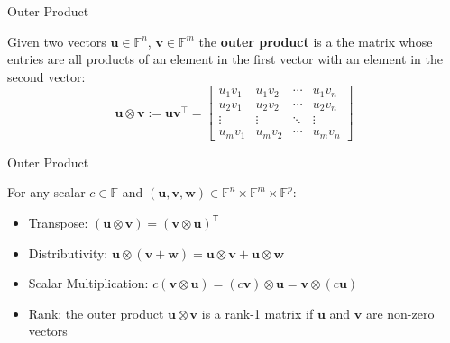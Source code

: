 \documentclass{beamer}
\begin{document}
    \begin{frame}{Outer Product}
        \begin{definition}
            Given two vectors $\mathbf{u} \in \mathbb{F}^n$, $\mathbf{v} \in \mathbb{F}^m$ the 
            \textbf{outer product} is a the matrix whose entries are all products of an element in
            the first vector with an element in the second vector:
            \begin{equation*}
                \mathbf{u} \otimes \mathbf{v} := \mathbf{u}\mathbf{v}^{\top} = \begin{bmatrix}
                    u_1 v_1 & u_1 v_2 & \cdots & u_1 v_n \\
                    u_2 v_1 & u_2 v_2 & \cdots & u_2 v_n \\
                    \vdots & \vdots & \ddots & \vdots \\
                    u_m v_1 & u_m v_2 & \cdots & u_m v_n
                \end{bmatrix}
            \end{equation*}
        \end{definition}
    \end{frame}

    \begin{frame}{Outer Product}
        \begin{lemma}
            For any scalar $c \in \mathbb{F}$ and $(\mathbf{u}, \mathbf{v}, \mathbf{w}) \in \mathbb{F}^n \times \mathbb{F}^m \times \mathbb{F}^p$:
            \begin{itemize}
                \item Transpose: $(\mathbf{u} \otimes \mathbf{v}) = (\mathbf{v} \otimes \mathbf{u})^{\textsf{T}}$
                \item Distributivity: $\mathbf{u} \otimes (\mathbf{v} + \mathbf{w}) = \mathbf{u} \otimes \mathbf{v} + \mathbf{u} \otimes \mathbf{w}$
                \item Scalar Multiplication: $c(\mathbf{v} \otimes \mathbf{u}) = (c\mathbf{v}) \otimes \mathbf{u} = \mathbf{v} \otimes (c\mathbf{u})$
                \item Rank: the outer product $\mathbf{u} \otimes \mathbf{v}$ is a rank-1 matrix if $\mathbf{u}$ and $\mathbf{v}$ are non-zero
                vectors
            \end{itemize}
        \end{lemma}
    \end{frame}
\end{document}
